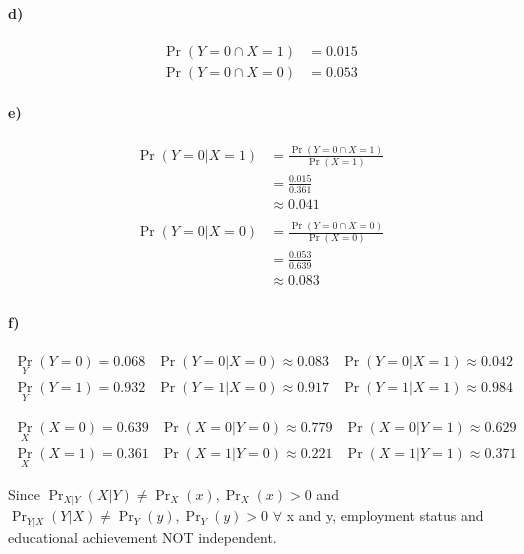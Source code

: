 \documentclass[10pt,letter]{article}
\begin{document}
\paragraph{d)}
\begin{align*}
\Pr(Y = 0 \cap X=1)
&= 0.015
\\
\Pr(Y = 0 \cap X=0)
&= 0.053
\end{align*}

\paragraph{e)}
\begin{align*}
\Pr(Y=0|X=1) &=  \frac{\Pr(Y = 0 \cap X=1)}{\Pr(X = 1)} \\
&=\frac{0.015}{0.361}\\
&\approx 0.041\\
\\
\Pr(Y=0|X=0) &=  \frac{\Pr(Y = 0 \cap X=0)}{\Pr(X = 0)} \\
&=\frac{0.053}{0.639}\\
&\approx 0.083\\
\end{align*}
\pagebreak

\paragraph{f)}
\begin{center}
\[
\begin{matrix}
\Pr_{Y}(Y= 0)=0.068 & \Pr(Y=0|X=0)\approx0.083 & \Pr(Y=0|X=1)\approx0.042 \\
\Pr_{Y}(Y= 1)=0.932 & \Pr(Y=1|X=0)\approx0.917 & \Pr(Y=1|X=1)\approx0.984
\end{matrix}
\]

\[
\begin{matrix}
\Pr_{X}(X=0)=0.639 & \Pr(X=0|Y=0)\approx0.779 & \Pr(X=0|Y=1)\approx0.629 \\
\Pr_{X}(X=1)=0.361 & \Pr(X=1|Y=0)\approx0.221 & \Pr(X=1|Y=1)\approx0.371
\end{matrix}
\]

Since $\Pr_{X|Y}(X|Y) \neq \Pr_{X}(x), \Pr_{X}(x)>0$
and  $\Pr_{Y|X}(Y|X) \neq \Pr_{Y}(y), \Pr_{Y}(y)>0$  $\forall$ x and y, employment status and educational achievement NOT independent.
\end{center}
\end{document}

